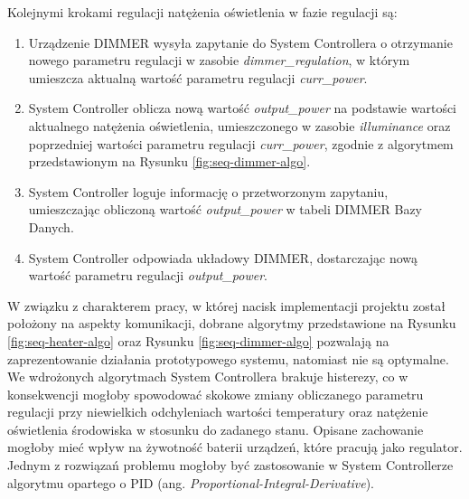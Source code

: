             Kolejnymi krokami regulacji natężenia oświetlenia w fazie regulacji są:
            \begin{enumerate}
                \item Urządzenie DIMMER wysyła zapytanie do System Controllera o otrzymanie nowego parametru regulacji w zasobie \textit{dimmer\_regulation}, w którym umieszcza aktualną wartość parametru regulacji \textit{curr\_power}.
                \item System Controller oblicza nową wartość \textit{output\_power} na podstawie wartości aktualnego natężenia oświetlenia, umieszczonego w zasobie \textit{illuminance} oraz poprzedniej wartości parametru regulacji \textit{curr\_power}, zgodnie z algorytmem przedstawionym na Rysunku \ref{fig:seq-dimmer-algo}.
                \item System Controller loguje informację o przetworzonym zapytaniu, umieszczając obliczoną wartość \textit{output\_power} w tabeli DIMMER Bazy Danych.
                \item System Controller odpowiada układowy DIMMER, dostarczając nową wartość parametru regulacji \textit{output\_power}.
            \end{enumerate}

            W związku z charakterem pracy, w której nacisk implementacji projektu został położony na aspekty komunikacji, dobrane algorytmy przedstawione na Rysunku \ref{fig:seq-heater-algo} oraz Rysunku \ref{fig:seq-dimmer-algo} pozwalają na zaprezentowanie działania prototypowego systemu, natomiast nie są optymalne. We wdrożonych algorytmach System Controllera brakuje histerezy, co w konsekwencji mogłoby spowodować skokowe zmiany obliczanego parametru regulacji przy niewielkich odchyleniach wartości temperatury oraz natężenie oświetlenia środowiska w stosunku do zadanego stanu. Opisane zachowanie mogłoby mieć wpływ na żywotność baterii urządzeń, które pracują jako regulator. Jednym z rozwiązań problemu mogłoby być zastosowanie w System Controllerze algorytmu opartego o PID (ang. \textit{Proportional-Integral-Derivative}).

